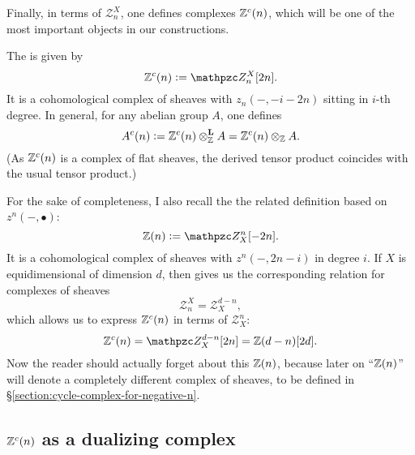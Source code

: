 \vspace{1em}

Finally, in terms of $\mathcal{Z}_n^X$, one defines complexes $\mathbb{Z}^c (n)$, which
will be one of the most important objects in our constructions.

\begin{definition}
  The  is given by
  $$\ZZ^c (n) \dfn \mathcal{Z}_n^X [2n].$$
  It is a cohomological complex of sheaves with $z_n (-, -i-2n)$ sitting in
  $i$-th degree. In general, for any abelian group $A$, one defines
  $$A^c (n) \mathrel{\mathop:}= \mathbb{Z}^c (n) \otimes^\mathbf{L}_{\mathbb{Z}} A = \mathbb{Z}^c (n) \otimes_{\mathbb{Z}} A.$$
  (As $\mathbb{Z}^c (n)$ is a complex of flat sheaves, the derived tensor product
  coincides with the usual tensor product.)
\end{definition}

For the sake of completeness, I also recall the the related definition based on
$z^n (-, \bullet)$:
$$\ZZ (n) \dfn \mathcal{Z}^n_X [-2n].$$
It is a cohomological complex of sheaves with $z^n (-, 2n-i)$ in degree $i$.
If $X$ is equidimensional of dimension $d$, then
 gives us the corresponding
relation for complexes of sheaves
$$\mathcal{Z}_n^X = \mathcal{Z}^{d-n}_X,$$
which allows us to express $\mathbb{Z}^c (n)$ in terms of $\mathcal{Z}^n_X$:
$$\ZZ^c (n) = \mathcal{Z}^{d-n}_X [2n] = \ZZ (d-n) [2d].$$
Now the reader should actually forget about this $\mathbb{Z} (n)$, because later on
``$\mathbb{Z} (n)$'' will denote a completely different complex of sheaves, to be
defined in \S\ref{section:cycle-complex-for-negative-n}.


\subsection*{$\mathbb{Z}^c (n)$ as a dualizing complex}

